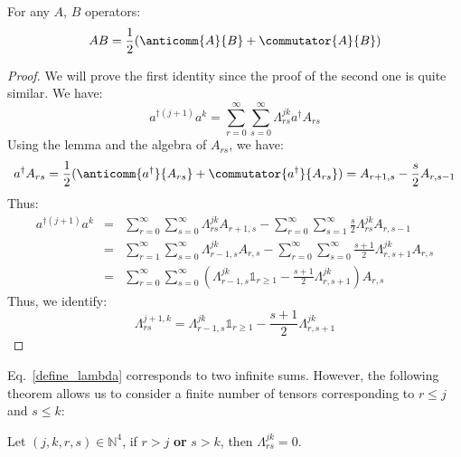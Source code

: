 \begin{lemma}
    For any $A$, $B$ operators:
    \begin{equation}
        A B = \frac{1}{2} (\anticomm{A}{B} + \commutator{A}{B})
    \end{equation}
\end{lemma}

\begin{proof}
    We will prove the first identity since the proof of the second one is quite similar. We have:
    \begin{equation}
        a^{\dagger (j+1)} a^k = \sum_{r=0}^\infty \sum_{s=0}^\infty \Lambda^{j k}_{r s} a^\dagger A_{r s}
    \end{equation}
    Using the lemma and the algebra of $A_{r s}$, we have:
    \begin{equation}
        a^\dagger A_{r s} = \frac{1}{2} (\anticomm{a^\dagger}{A_{r s}} + \commutator{a^\dagger}{A_{r s}}) = A_{r+1, s} - \frac{s}{2} A_{r, s-1}
    \end{equation}
    Thus:
    \begin{eqnarray}
        a^{\dagger (j+1)} a^k &=& \sum_{r=0}^\infty \sum_{s=0}^\infty \Lambda^{j k}_{r s} A_{r+1, s} - \sum_{r=0}^\infty \sum_{s=1}^\infty \frac{s}{2} \Lambda^{j k}_{r s} A_{r, s-1} \nonumber\\
        &=& \sum_{r=1}^\infty \sum_{s=0}^\infty \Lambda^{j k}_{r-1, s} A_{r, s} - \sum_{r=0}^\infty \sum_{s=0}^\infty \frac{s+1}{2} \Lambda^{j k}_{r, s+1} A_{r, s} \nonumber\\
        &=& \sum_{r=0}^\infty \sum_{s=0}^\infty \left(\Lambda^{j k}_{r-1, s} \mathbb{1}_{r \ge 1} - \frac{s+1}{2} \Lambda^{j k}_{r, s+1} \right)A_{r, s}
    \end{eqnarray}
    Thus, we identify:
    \begin{equation}
        \Lambda^{j+1, k}_{r s} = \Lambda^{j k}_{r-1, s} \mathbb{1}_{r \ge 1} - \frac{s+1}{2} \Lambda^{j k}_{r, s+1}
    \end{equation}
\end{proof}

Eq.~\ref{define_lambda} corresponds to two infinite sums. However, the following theorem allows us to consider a finite number of tensors corresponding to $r \le j$ and $s \le k$:

\begin{theorem}
    Let $(j, k, r, s) \in \mathbb{N}^4$, if $r > j$ \textbf{or} $s > k$, then $\Lambda^{j k}_{r s} = 0$.
\end{theorem}

